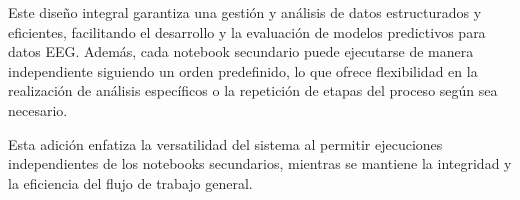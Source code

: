 Este diseño integral garantiza una gestión y análisis de datos estructurados y eficientes, facilitando el desarrollo y la evaluación de modelos predictivos para datos EEG. Además, cada notebook secundario puede ejecutarse de manera independiente siguiendo un orden predefinido, lo que ofrece flexibilidad en la realización de análisis específicos o la repetición de etapas del proceso según sea necesario.

Esta adición enfatiza la versatilidad del sistema al permitir ejecuciones independientes de los notebooks secundarios, mientras se mantiene la integridad y la eficiencia del flujo de trabajo general.





